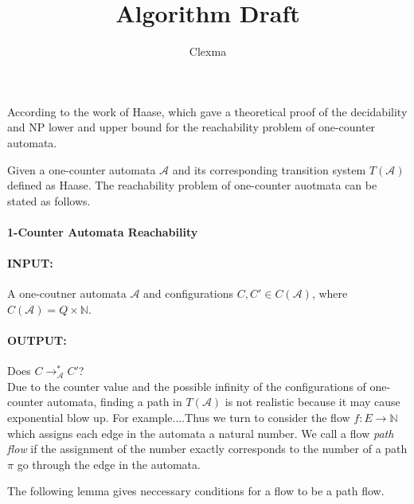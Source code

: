 \documentclass{article}
\title{Algorithm Draft}
\author{Clexma}
\begin{document}
\maketitle



According to the work of Haase, which gave a theoretical proof of the decidability and NP lower and upper bound for the reachability problem of one-counter automata.

Given a one-counter automata $\mathcal{A}$ and its corresponding transition system $T(\mathcal{A})$ defined as Haase. The reachability problem of one-counter auotmata can be stated as follows.

\paragraph{1-Counter Automata Reachability}

\paragraph{INPUT:} A one-coutner automata $\mathcal{A}$ and configurations $C, C'\in C(\mathcal{A})$, where $C(\mathcal{A}) = Q \times \mathbb{N}$.

\paragraph{OUTPUT:} Does $C \rightarrow^*_\mathcal{A} C'$?\\

Due to the counter value and the possible infinity of the configurations of one-counter automata, finding a path in $T(\mathcal{A})$ is not realistic because it may cause exponential blow up. For example....Thus we turn to consider the flow $f: E \rightarrow \mathbb{N}$ which assigns each edge in the automata a natural number. We call a flow \textit{path flow } if the assignment of the number exactly corresponds to the number of a path $\pi$ go through the edge in the automata. 

The following lemma gives neccessary conditions for a flow to be a path flow.
\end{document}

